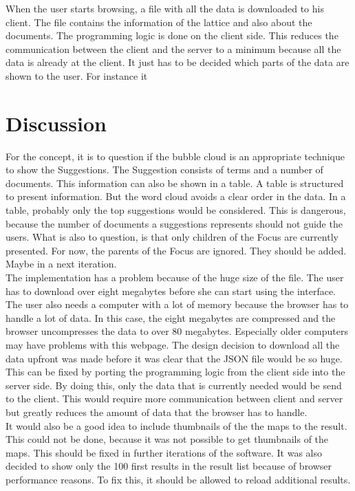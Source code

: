 \documentclass[11pt]{report}
\begin{document}
When the user starts browsing, a  file with all the data is downloaded to his client. The file contains the information of the lattice and also about the documents. The programming logic is done on the client side. This reduces the communication between the client and the server to a minimum because all the data is already at the client. It just has to be decided which parts of the data are shown to the user. For instance it 

\section{Discussion}
\label{fancydis}

For the concept, it is to question if the bubble cloud is an appropriate technique to show the Suggestions. The Suggestion consists of terms and a number of documents. This information can also be shown in a table. A table is structured to present information. But the word cloud avoids a clear order in the data. In a table, probably only the top suggestions would be considered. This is dangerous, because the number of documents a suggestions represents should not guide the users. What is also to question, is that only children of the Focus are currently presented. For now, the parents of the Focus are ignored. They should be added. Maybe in a next iteration.\\

The implementation has a problem because of the huge size of the  file. The user has to download over eight megabytes before she can start using the interface. The user also needs a computer with a lot of memory because the browser has to handle a lot of data. In this case, the eight megabytes are compressed and the browser uncompresses the data to over 80 megabytes. Especially older computers may have problems with this webpage. The design decision to download all the data upfront was made before it was clear that the JSON file would be so huge. This can be fixed by porting the programming logic from the client side into the server side. By doing this, only the data that is currently needed would be send to the client. This would require more communication between client and server but greatly reduces the amount of data that the browser has to handle. \\

 It would also be a good idea to include thumbnails of the the maps to the result. This could not be done, because it was not possible to get thumbnails of the maps. This should be fixed in further iterations of the software. It was also decided to show only the 100 first results in the result list because of browser performance reasons. To fix this, it should be allowed to reload additional results.
\end{document}
